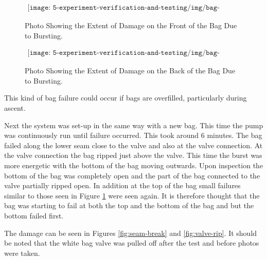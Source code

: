 \begin{figure}[H]
    \begin{align*}
        \texttt{[image: 5-experiment-verification-and-testing/img/bag-burst-front.png]}
    \end{align*}
    \caption {Photo Showing the Extent of Damage on the Front of the Bag Due to Bursting.} \label{fig:bag-burst-front}
\end{figure}

\begin{figure}[H]
    \begin{align*}
        \texttt{[image: 5-experiment-verification-and-testing/img/bag-burst-back.png]}
    \end{align*}
    \caption {Photo Showing the Extent of Damage on the Back of the Bag Due to Bursting.} \label{fig:bag-burst-back}
\end{figure}

This kind of bag failure could occur if bags are overfilled, particularly during ascent.

Next the system was set-up in the same way with a new bag. This time the pump was continuously run until failure occurred. This took around 6 minutes. The bag failed along the lower seam close to the valve and also at the valve connection. At the valve connection the bag ripped just above the valve. This time the burst was more energetic with the bottom of the bag moving outwards. Upon inspection the bottom of the bag was completely open and the part of the bag connected to the valve partially ripped open. In addition at the top of the bag small failures similar to those seen in Figure \ref{fig:bag-burst-front} were seen again. It is therefore thought that the bag was starting to fail at both the top and the bottom of the bag and but the bottom failed first.

The damage can be seen in Figures \ref{fig:seam-break} and \ref{fig:valve-rip}. It should be noted that the white bag valve was pulled off after the test and before photos were taken.

